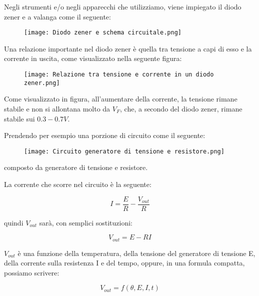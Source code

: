 Negli strumenti e/o negli apparecchi che utilizziamo, 
viene impiegato il diodo zener e a valanga come il seguente: 

\begin{figure}[h]
    \centering
    \texttt{[image: Diodo zener e schema circuitale.png]}
\end{figure}

Una relazione importante nel diodo zener è quella tra tensione a capi di esso e la corrente in uscita, 
come visualizzato nella seguente figura:

\begin{figure}[h]
    \centering
    \texttt{[image: Relazione tra tensione e corrente in un diodo zener.png]}
\end{figure}

Come visualizzato in figura, 
all'aumentare della corrente, la tensione rimane stabile e non si allontana molto da $V_F$, 
che, a secondo del diodo zener, rimane stabile sui $0.3 - 0.7 V$. \newline

Prendendo per esempio una porzione di circuito come il seguente: 

\begin{figure}[h]
    \centering
    \texttt{[image: Circuito generatore di tensione e resistore.png]}
\end{figure}

composto da generatore di tensione e resistore. \newline

La corrente che scorre nel circuito è la seguente: 

{
    \Large 
    \begin{equation}
        I = \frac{E}{R} - \frac{V_{out}}{R}
    \end{equation}
}

quindi $V_{out}$ sarà, con semplici sostituzioni:

{
    \Large 
    \begin{equation}
        V_{out} = E - RI
    \end{equation}
}

$V_{out}$ è una funzione della temperatura, della tensione del generatore di tensione E, 
della corrente sulla resistenza I e del tempo, oppure, 
in una formula compatta, possiamo scrivere: 

{
    \Large 
    \begin{equation}
        V_{out} = f(\theta, E, I, t)
    \end{equation}
}

